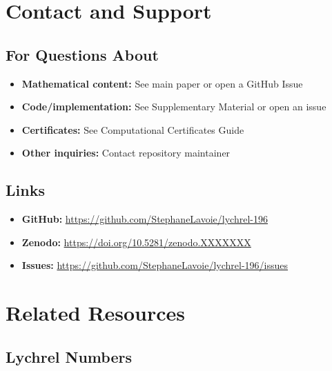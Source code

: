 \documentclass[11pt,a4paper]{article}
\begin{document}
\section{Contact and Support}

\subsection{For Questions About}

\begin{itemize}[leftmargin=*]
\item \textbf{Mathematical content:} See main paper or open a GitHub Issue
\item \textbf{Code/implementation:} See Supplementary Material or open an issue
\item \textbf{Certificates:} See Computational Certificates Guide
\item \textbf{Other inquiries:} Contact repository maintainer
\end{itemize}

\subsection{Links}

\begin{itemize}[leftmargin=*,noitemsep]
\item \textbf{GitHub:} \url{https://github.com/StephaneLavoie/lychrel-196}
\item \textbf{Zenodo:} \url{https://doi.org/10.5281/zenodo.XXXXXXX}
\item \textbf{Issues:} \url{https://github.com/StephaneLavoie/lychrel-196/issues}
\end{itemize}

\section{Related Resources}

\subsection{Lychrel Numbers}
\end{document}
